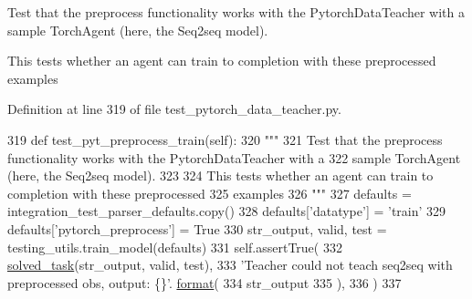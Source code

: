 \begin{DoxyVerb}Test that the preprocess functionality works with the PytorchDataTeacher with a
sample TorchAgent (here, the Seq2seq model).

This tests whether an agent can train to completion with these preprocessed
examples
\end{DoxyVerb}
 

Definition at line 319 of file test\+\_\+pytorch\+\_\+data\+\_\+teacher.\+py.


\begin{DoxyCode}
319     \textcolor{keyword}{def }test\_pyt\_preprocess\_train(self):
320         \textcolor{stringliteral}{"""}
321 \textcolor{stringliteral}{        Test that the preprocess functionality works with the PytorchDataTeacher with a}
322 \textcolor{stringliteral}{        sample TorchAgent (here, the Seq2seq model).}
323 \textcolor{stringliteral}{}
324 \textcolor{stringliteral}{        This tests whether an agent can train to completion with these preprocessed}
325 \textcolor{stringliteral}{        examples}
326 \textcolor{stringliteral}{        """}
327         defaults = integration\_test\_parser\_defaults.copy()
328         defaults[\textcolor{stringliteral}{'datatype'}] = \textcolor{stringliteral}{'train'}
329         defaults[\textcolor{stringliteral}{'pytorch\_preprocess'}] = \textcolor{keyword}{True}
330         str\_output, valid, test = testing\_utils.train\_model(defaults)
331         self.assertTrue(
332             \hyperlink{namespacetests_1_1test__pytorch__data__teacher_a5511223c74b5eca00f42d68488ea101e}{solved\_task}(str\_output, valid, test),
333             \textcolor{stringliteral}{'Teacher could not teach seq2seq with preprocessed obs, output: \{\}'}.
      \hyperlink{namespaceparlai_1_1chat__service_1_1services_1_1messenger_1_1shared__utils_a32e2e2022b824fbaf80c747160b52a76}{format}(
334                 str\_output
335             ),
336         )
337 
\end{DoxyCode}
\mbox{\label{classtests_1_1test__pytorch__data__teacher_1_1TestPytorchDataTeacher_a4321d4b1619bf66a94146e811d869185}} 
